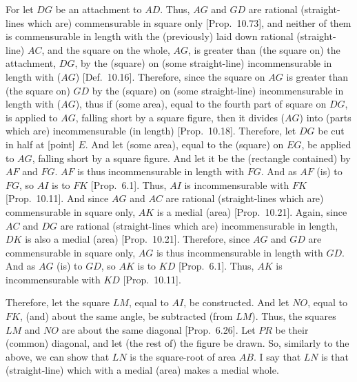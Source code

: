 \begin{Parallel}{}{}
{For let $DG$ be an attachment to $AD$. Thus, $AG$ and $GD$ are rational (straight-lines which are) commensurable in square only [Prop.~10.73], and neither of them is
commensurable in length with the (previously) laid down rational (straight-line) $AC$, and the square on the whole, $AG$, is greater than (the square on)
the attachment, $DG$, by the (square) on (some straight-line)
incommensurable in length with ($AG$) [Def.~10.16]. Therefore, since the square on $AG$
is greater than (the square on) $GD$ by the (square) on (some straight-line)
incommensurable in length with ($AG$), thus if (some area), equal to
the fourth part of square on $DG$, is applied to $AG$, falling short
by a square figure, then it divides ($AG$) into (parts which are) incommensurable
(in length) [Prop.~10.18]. Therefore, let $DG$ be cut in  half at [point] $E$. And let (some area), equal to the
(square) on $EG$, be applied to $AG$, falling short by a square figure.
And let it be the (rectangle contained) by $AF$ and $FG$. $AF$ is
thus incommensurable in length with $FG$. And as $AF$ (is) to $FG$,
so $AI$ is to $FK$ [Prop.~6.1].  Thus, $AI$
is incommensurable with $FK$ [Prop.~10.11]. 
And since $AG$ and $AC$ are rational (straight-lines which are)
commensurable in square only, $AK$ is a medial (area) [Prop.~10.21]. Again, since $AC$ and $DG$
are rational (straight-lines which are) incommensurable in length, $DK$
is also a medial (area) [Prop.~10.21]. Therefore,
since $AG$ and $GD$ are commensurable in square only,  $AG$
is thus incommensurable in length with $GD$. And as $AG$ (is) to $GD$,
so $AK$ is to $KD$ [Prop.~6.1]. Thus, $AK$
is incommensurable with $KD$ [Prop.~10.11].

Therefore, let the square $LM$, equal to $AI$, be constructed.
And let $NO$, equal to $FK$, (and) about the same angle, be subtracted (from $LM$). Thus, the squares $LM$ and $NO$ are about the
same diagonal [Prop.~6.26]. 
Let $PR$ be their (common) diagonal, and let (the rest of) the figure be drawn.
So, similarly to the above, we can show that $LN$ is the square-root of
area $AB$. I say that $LN$ is  that (straight-line) which with a medial (area) makes a medial whole.

}
\end{Parallel}
